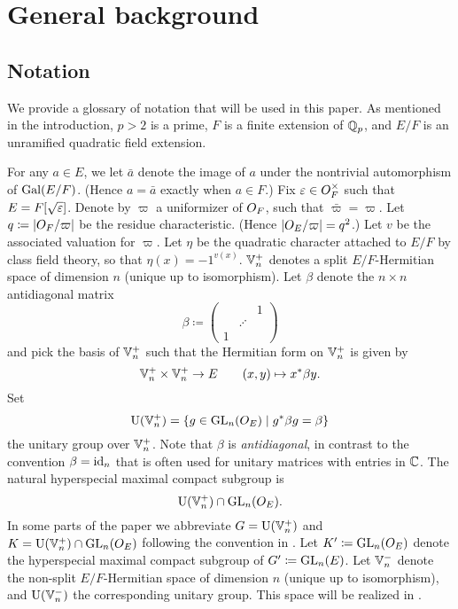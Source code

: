 \chapter{General background}
\label{ch:background}

\section{Notation}
We provide a glossary of notation that will be used in this paper.
As mentioned in the introduction, $p > 2$ is a prime,
$F$ is a finite extension of $\mathbb Q_p$,
and $E/F$ is an unramified quadratic field extension.

\begin{itemize}
  \ii For any $a \in E$, we let $\bar a$ denote the image of $a$
  under the nontrivial automorphism of $\operatorname{Gal}(E/F)$.
  (Hence $a = \bar a$ exactly when $a \in F$.)
  \ii Fix $\varepsilon \in O_F^\times$ such that $E = F[\sqrt{\varepsilon}]$.
  \ii Denote by $\varpi$ a uniformizer of $O_F$, such that $\bar \varpi = \varpi$.
  \ii Let $q \coloneqq |O_F/\varpi|$ be the residue characteristic.
  (Hence $|O_E / \varpi| = q^2$.)
  \ii Let $v$ be the associated valuation for $\varpi$.
  \ii Let $\eta$ be the quadratic character attached to $E/F$ by class field theory,
  so that $\eta(x) = -1^{v(x)}$.
  \ii $\mathbb V_n^+$ denotes a split $E/F$-Hermitian space of dimension $n$ (unique up to isomorphism).
  \ii Let $\beta$ denote the $n \times n$ antidiagonal matrix
  \[ \beta \coloneqq \begin{pmatrix} && 1 \\ & \iddots \\ 1 \end{pmatrix} \]
  and pick the basis of $\mathbb V_n^+$ such that the Hermitian form on $\mathbb V_n^+$ is given by
  \[ \mathbb V_n^+ \times \mathbb V_n^+ \to E \qquad (x,y) \mapsto x^\ast \beta y. \]
  \ii Set
  \[ \operatorname{U}(\mathbb V_n^+) = \{ g \in \operatorname{GL}_n(O_E) \mid g^\ast \beta g = \beta\} \]
  the unitary group over $\mathbb V_n^+$.
  Note that $\beta$ is \emph{antidiagonal}, in contrast to the convention $\beta = \operatorname{id}_n$
  that is often used for unitary matrices with entries in $\mathbb C$.
  The natural hyperspecial maximal compact subgroup
  is \[ \operatorname{U}(\mathbb V_n^+) \cap \operatorname{GL}_n(O_E). \]
  In some parts of the paper we abbreviate $G = \operatorname{U}(\mathbb V_n^+)$ and $K = \operatorname{U}(\mathbb V_n^+) \cap \operatorname{GL}_n(O_E)$
  following the convention in \cite{ref:AFLspherical}.
  \ii Let $K' \coloneqq \operatorname{GL}_n(O_E)$ denote the hyperspecial maximal compact subgroup of $G' \coloneqq \operatorname{GL}_n(E)$.
  \ii Let $\mathbb V_n^-$ denote the non-split $E/F$-Hermitian space of dimension $n$
  (unique up to isomorphism), and $\operatorname{U}(\mathbb V_n^-)$ the corresponding unitary group.
  This space will be realized in .
\end{itemize}

